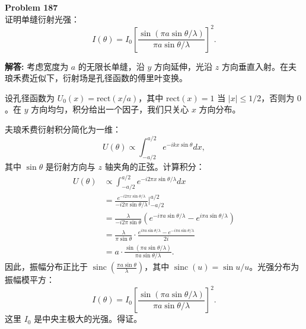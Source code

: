 \documentclass[12pt, a4paper, oneside]{ctexart}
\newenvironment{solution}{\par\noindent\textbf{解答:}\quad}{\par}
\begin{document}
\begin{mdframed}[backgroundcolor=gray!10, linewidth=0pt]
    \textbf{Problem 187} \\
    证明单缝衍射光强：
    \[
    I(\theta) = I_0 \left[ \frac{\sin(\pi a \sin\theta / \lambda)}{\pi a \sin\theta / \lambda} \right]^2.
    \]
\end{mdframed}
\begin{solution}
    考虑宽度为 $a$ 的无限长单缝，沿 $y$ 方向延伸，光沿 $z$ 方向垂直入射。在夫琅禾费近似下，衍射场是孔径函数的傅里叶变换。

    设孔径函数为 $U_0(x) = \text{rect}(x/a)$，其中 $\text{rect}(x) = 1$ 当 $|x| \le 1/2$，否则为 $0$。在 $y$ 方向均匀，积分给出一个因子，我们只关心 $x$ 方向分布。

    夫琅禾费衍射积分简化为一维：
    \[
    U(\theta) \propto \int_{-a/2}^{a/2} e^{-i k x \sin\theta} dx,
    \]
    其中 $\sin\theta$ 是衍射方向与 $z$ 轴夹角的正弦。计算积分：
    \begin{align*}
        U(\theta) &\propto \int_{-a/2}^{a/2} e^{-i 2\pi x \sin\theta / \lambda} dx \\
        &= \frac{e^{-i 2\pi x \sin\theta / \lambda}}{-i 2\pi \sin\theta / \lambda} \Big|_{-a/2}^{a/2} \\
        &= \frac{\lambda}{-i 2\pi \sin\theta} \left( e^{-i \pi a \sin\theta / \lambda} - e^{i \pi a \sin\theta / \lambda} \right) \\
        &= \frac{\lambda}{\pi \sin\theta} \cdot \frac{e^{i \pi a \sin\theta / \lambda} - e^{-i \pi a \sin\theta / \lambda}}{2i} \\
        &= a \cdot \frac{\sin(\pi a \sin\theta / \lambda)}{\pi a \sin\theta / \lambda}.
    \end{align*}
    因此，振幅分布正比于 $\operatorname{sinc}\left( \frac{\pi a \sin\theta}{\lambda} \right)$，其中 $\operatorname{sinc}(u) = \sin u / u$。光强分布为振幅模平方：
    \[
    I(\theta) = I_0 \left[ \frac{\sin(\pi a \sin\theta / \lambda)}{\pi a \sin\theta / \lambda} \right]^2.
    \]
    这里 $I_0$ 是中央主极大的光强。得证。
\end{solution}
\end{document}
